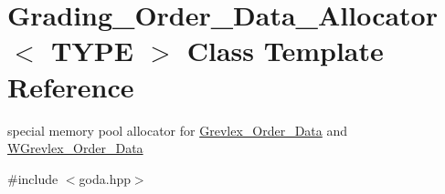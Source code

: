 \hypertarget{class_grading___order___data___allocator}{}\section{Grading\+\_\+\+Order\+\_\+\+Data\+\_\+\+Allocator$<$ T\+Y\+PE $>$ Class Template Reference}
\label{class_grading___order___data___allocator}


special memory pool allocator for \hyperlink{class_grevlex___order___data}{Grevlex\+\_\+\+Order\+\_\+\+Data} and \hyperlink{class_w_grevlex___order___data}{W\+Grevlex\+\_\+\+Order\+\_\+\+Data}  




{\ttfamily \#include $<$goda.\+hpp$>$}

